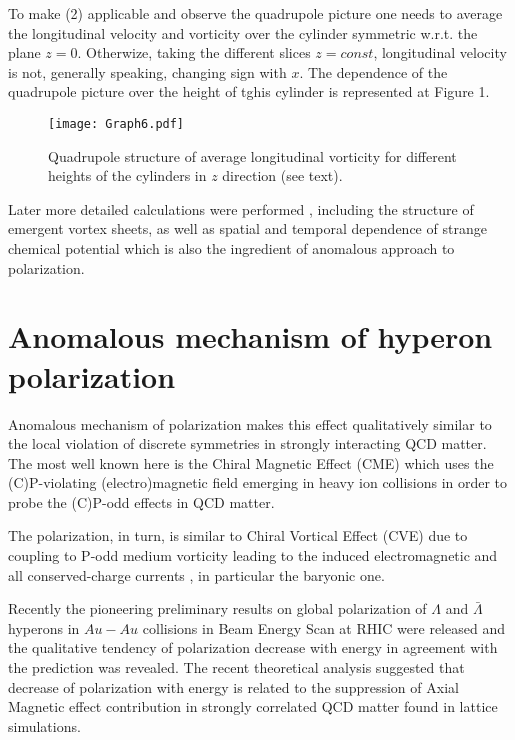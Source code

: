 \documentclass[preprint,aps,showpacs,nofootinbib,superscriptaddress,preprintnumbers,epsf,psf]{revtex4}
\begin{document}
To make (2) applicable and observe the quadrupole picture one needs to average the longitudinal velocity and vorticity over the cylinder symmetric
w.r.t. the plane $z=0$. Otherwize, taking the different slices $z=const$, longitudinal velocity is not, generally speaking,  changing sign with $x$.
The dependence of the quadrupole picture over the height of tghis cylinder is represented at Figure 1. 

\begin{figure}[h!]
\texttt{[image: Graph6.pdf]}
\caption{Quadrupole structure of average longitudinal vorticity for different heights of the cylinders in $z$ direction (see text).}
\end{figure}









Later more detailed calculations were performed \cite{Baznat:2015eca},
including the structure of emergent vortex sheets, as well as 
spatial and temporal dependence of strange chemical
potential which is also the ingredient of anomalous approach to
polarization. 

\section{Anomalous mechanism of hyperon polarization}


Anomalous mechanism of polarization makes this effect qualitatively
similar to the local violation \cite{Fukushima:2008xe} of discrete
symmetries in strongly interacting QCD matter. The most well known
here is the Chiral Magnetic Effect (CME) which uses the
(C)P-violating (electro)magnetic field emerging in heavy ion
collisions in order to probe the (C)P-odd effects in QCD matter.

The polarization, in turn, is similar to Chiral Vortical Effect
(CVE)\cite{Kharzeev:2007tn} due to coupling to P-odd medium
vorticity leading to the induced electromagnetic and all
conserved-charge currents \cite{Rogachevsky:2010ys}, in particular
the baryonic one.

Recently the pioneering preliminary results on global polarization
of $\Lambda$ and $\bar \Lambda$ hyperons in $Au-Au$ collisions in
Beam Energy Scan at RHIC were released \cite{Lisa} and the
qualitative tendency of polarization decrease with energy in
agreement with the prediction \cite{Rogachevsky:2010ys} was
revealed.  The recent theoretical analysis \cite{Sorin:2016smp}
suggested that decrease of polarization with energy is related to
the suppression of Axial Magnetic effect contribution in strongly
correlated QCD matter found in lattice simulations.
\end{document}
